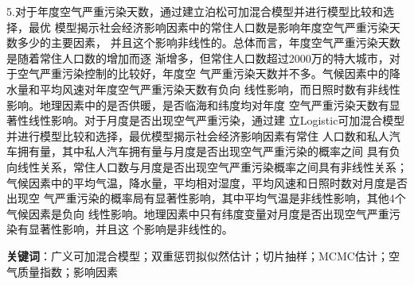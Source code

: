 \begin{cabstract}
  5.对于年度空气严重污染天数，通过建立泊松可加混合模型并进行模型比较和选择，最优
  模型揭示社会经济影响因素中的常住人口数是影响年度空气严重污染天数多少的主要因素，
  并且这个影响非线性的。总体而言，年度空气严重污染天数是随着常住人口数的增加而逐
  渐增多，但常住人口数超过2000万的特大城市，对于空气严重污染控制的比较好，年度空
  气严重污染天数并不多。气候因素中的降水量和平均风速对年度空气严重污染天数有负向
  线性影响，而日照时数有非线性影响。地理因素中的是否供暖，是否临海和纬度均对年度
  空气严重污染天数有显著性线性影响。对于月度是否出现空气严重污染，通过建
  立Logistic可加混合模型并进行模型比较和选择，最优模型揭示社会经济影响因素有常住
  人口数和私人汽车拥有量，其中私人汽车拥有量与月度是否出现空气严重污染的概率之间
  具有负向线性关系，常住人口数与月度是否出现空气严重污染概率之间具有非线性关系；
  气候因素中的平均气温，降水量，平均相对湿度，平均风速和日照时数对月度是否出现空
  气严重污染的概率局有显著性影响，其中平均气温是非线性影响，其他4个气候因素是负向
  线性影响。地理因素中只有纬度变量对月度是否出现空气严重污染有显著性影响，并且这
  个影响是非线性的。
  
  \bigbreak

  {\bfseries 关键词}：广义可加混合模型；双重惩罚拟似然估计；切片抽样；MCMC估计；空气质量指数；影响因素
   

\end{cabstract}






